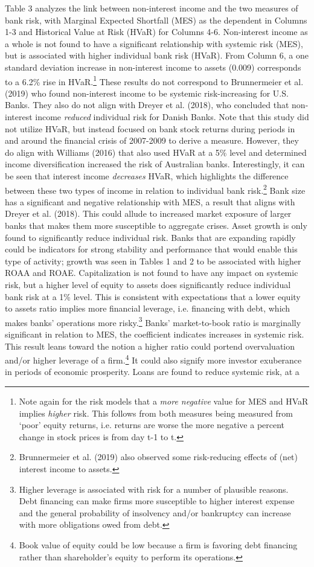 \documentclass[10pt]{article} %
\begin{document}
Table 3 analyzes the link between non-interest income and the two measures of bank risk, with Marginal Expected Shortfall (MES) as the dependent in Columns 1-3 and Historical Value at Risk (HVaR) for Columns 4-6. Non-interest income as a whole is not found to have a significant relationship with systemic risk (MES), but is associated with higher individual bank risk (HVaR). From Column 6, a one standard deviation increase in non-interest income to assets (0.009) corresponds to a 6.2\% rise in HVaR.\footnote{Note again for the risk models that a \textit{more negative} value for MES and HVaR implies \textit{higher} risk. This follows from both measures being measured from `poor' equity returns, i.e. returns are worse the more negative a percent change in stock prices is from day t-1 to t.} These results do not correspond to Brunnermeier et al. (2019) who found non-interest income to be systemic risk-increasing for U.S. Banks. They also do not align with Dreyer et al. (2018), who concluded that non-interest income \textit{reduced} individual risk for Danish Banks. Note that this study did not utilize HVaR, but instead focused on bank stock returns during periods in and around the financial crisis of 2007-2009 to derive a measure. However, they do align with Williams (2016) that also used HVaR at a 5\% level and determined income diversification increased the risk of Australian banks. Interestingly, it can be seen that interest income \textit{decreases} HVaR, which highlights the difference between these two types of income in relation to individual bank risk.\footnote{Brunnermeier et al. (2019) also observed some risk-reducing effects of (net) interest income to assets.} Bank size has a significant and negative relationship with MES, a result that aligns with Dreyer et al. (2018). This could allude to increased market exposure of larger banks that makes them more susceptible to aggregate crises. Asset growth is only found to significantly reduce individual risk. Banks that are expanding rapidly could be indicators for strong stability and performance that would enable this type of activity; growth was seen in Tables 1 and 2 to be associated with higher ROAA and ROAE. Capitalization is not found to have any impact on systemic risk, but a higher level of equity to assets does significantly reduce individual bank risk at a 1\% level. This is consistent with expectations that a lower equity to assets ratio implies more financial leverage, i.e. financing with debt, which makes banks' operations more risky.\footnote{Higher leverage is associated with risk for a number of plausible reasons. Debt financing can make firms more susceptible to higher interest expense and the general probability of insolvency and/or bankruptcy can increase with more obligations owed from debt.}  Banks' market-to-book ratio is marginally significant in relation to MES, the coefficient indicates increases in systemic risk. This result leans toward the notion a higher ratio could portend overvaluation and/or higher leverage of a firm.\footnote{Book value of equity could be low because a firm is favoring debt financing rather than shareholder's equity to perform its operations.} It could also signify more investor exuberance in periods of economic prosperity. Loans are found to reduce systemic risk, at a 
\end{document}
